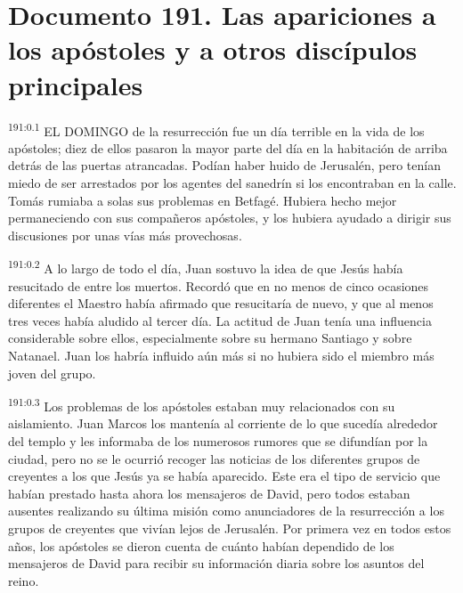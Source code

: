 \chapter{Documento 191. Las apariciones a los apóstoles y a otros discípulos principales}
\par
\textsuperscript{191:0.1} EL DOMINGO de la resurrección fue un día terrible en la vida de los apóstoles; diez de ellos pasaron la mayor parte del día en la habitación de arriba detrás de las puertas atrancadas. Podían haber huido de Jerusalén, pero tenían miedo de ser arrestados por los agentes del sanedrín si los encontraban en la calle. Tomás rumiaba a solas sus problemas en Betfagé. Hubiera hecho mejor permaneciendo con sus compañeros apóstoles, y los hubiera ayudado a dirigir sus discusiones por unas vías más provechosas.

\par
\textsuperscript{191:0.2} A lo largo de todo el día, Juan sostuvo la idea de que Jesús había resucitado de entre los muertos. Recordó que en no menos de cinco ocasiones diferentes el Maestro había afirmado que resucitaría de nuevo, y que al menos tres veces había aludido al tercer día. La actitud de Juan tenía una influencia considerable sobre ellos, especialmente sobre su hermano Santiago y sobre Natanael. Juan los habría influido aún más si no hubiera sido el miembro más joven del grupo.

\par
\textsuperscript{191:0.3} Los problemas de los apóstoles estaban muy relacionados con su aislamiento. Juan Marcos los mantenía al corriente de lo que sucedía alrededor del templo y les informaba de los numerosos rumores que se difundían por la ciudad, pero no se le ocurrió recoger las noticias de los diferentes grupos de creyentes a los que Jesús ya se había aparecido. Este era el tipo de servicio que habían prestado hasta ahora los mensajeros de David, pero todos estaban ausentes realizando su última misión como anunciadores de la resurrección a los grupos de creyentes que vivían lejos de Jerusalén. Por primera vez en todos estos años, los apóstoles se dieron cuenta de cuánto habían dependido de los mensajeros de David para recibir su información diaria sobre los asuntos del reino.

